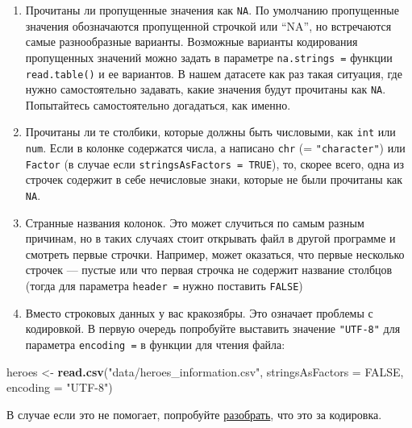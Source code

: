 \documentclass[]{book}
\newenvironment{Shaded}{\begin{snugshade}}{\end{snugshade}}
\newcommand{\KeywordTok}[1]{\textcolor[rgb]{0.13,0.29,0.53}{\textbf{#1}}}
\newcommand{\DataTypeTok}[1]{\textcolor[rgb]{0.13,0.29,0.53}{#1}}
\newcommand{\StringTok}[1]{\textcolor[rgb]{0.31,0.60,0.02}{#1}}
\newcommand{\OtherTok}[1]{\textcolor[rgb]{0.56,0.35,0.01}{#1}}
\newcommand{\NormalTok}[1]{#1}
\begin{document}
\begin{enumerate}
\def\labelenumi{\arabic{enumi}.}
\item
  Прочитаны ли пропущенные значения как \texttt{NA}. По умолчанию
  пропущенные значения обозначаются пропущенной строчкой или ``NA'', но
  встречаются самые разнообразные варианты. Возможные варианты
  кодирования пропущенных значений можно задать в параметре
  \texttt{na.strings\ =} функции \texttt{read.table()} и ее вариантов. В
  нашем датасете как раз такая ситуация, где нужно самостоятельно
  задавать, какие значения будут прочитаны как \texttt{NA}. Попытайтесь
  самостоятельно догадаться, как именно.
\item
  Прочитаны ли те столбики, которые должны быть числовыми, как
  \texttt{int} или \texttt{num}. Если в колонке содержатся числа, а
  написано \texttt{chr} (= \texttt{"character"}) или \texttt{Factor} (в
  случае если \texttt{stringsAsFactors\ =\ TRUE}), то, скорее всего,
  одна из строчек содержит в себе нечисловые знаки, которые не были
  прочитаны как \texttt{NA}.
\item
  Странные названия колонок. Это может случиться по самым разным
  причинам, но в таких случаях стоит открывать файл в другой программе и
  смотреть первые строчки. Например, может оказаться, что первые
  несколько строчек --- пустые или что первая строчка не содержит
  название столбцов (тогда для параметра \texttt{header\ =} нужно
  поставить \texttt{FALSE})
\item
  Вместо строковых данных у вас кракозябры. Это означает проблемы с
  кодировкой. В первую очередь попробуйте выставить значение
  \texttt{"UTF-8"} для параметра \texttt{encoding\ =} в функции для
  чтения файла:
\end{enumerate}

\begin{Shaded}
\begin{Highlighting}[]
\NormalTok{heroes <-}\StringTok{ }\KeywordTok{read.csv}\NormalTok{(}\StringTok{"data/heroes_information.csv"}\NormalTok{, }
                   \DataTypeTok{stringsAsFactors =} \OtherTok{FALSE}\NormalTok{,}
                   \DataTypeTok{encoding =} \StringTok{"UTF-8"}\NormalTok{)}
\end{Highlighting}
\end{Shaded}

В случае если это не помогает, попробуйте
\href{https://www.artlebedev.ru/decoder/}{разобрать}, что это за
кодировка.
\end{document}
